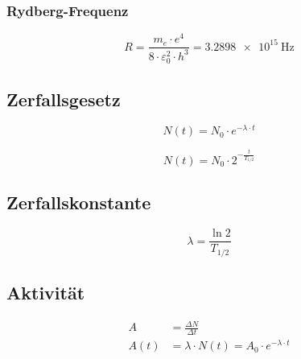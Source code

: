 \subsubsection{Rydberg-Frequenz}
\begin{equation}\label{eq:rydberg:frequenz}
R = \frac{m_e \cdot e^4}{8 \cdot \varepsilon_0^2 \cdot h^3} = \SI{3.2898e15}{\hertz} 
\end{equation}

\subsection{Zerfallsgesetz}
\begin{equation}\label{eq:zerfallsgesetz:zerfallskonstante}
N(t) = N_0 \cdot e^{-\lambda \cdot t}
\end{equation}

\begin{equation}\label{eq:zerfallsgesetz:halbwertszeit}
N(t) = N_0 \cdot 2^{-\frac{t}{T_{1/2}}}
\end{equation}

\subsection{Zerfallskonstante}
\begin{equation}\label{eq:zerfallskonstante}
\lambda = \frac{\ln 2}{T_{1/2}}
\end{equation}

\subsection{Aktivität}
\begin{align}
\label{eq:aktivitaet}
A &= \frac{\Delta N}{\Delta t} \\
\label{eq:aktivitaet:t}
A(t) &= \lambda \cdot N(t) = A_0 \cdot
e^{-\lambda \cdot t}
\end{align}
